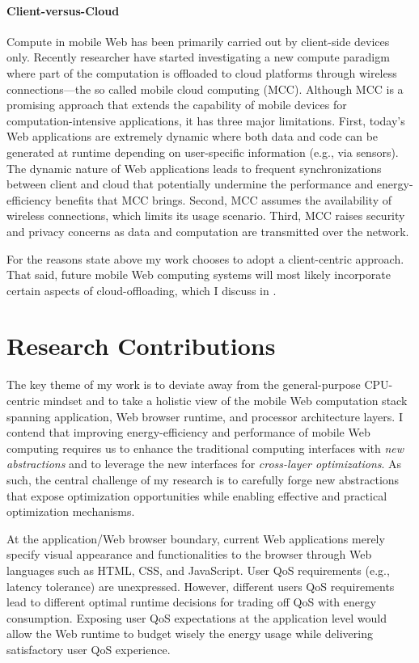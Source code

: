 \paragraph{Client-versus-Cloud} Compute in mobile Web has been primarily carried out by client-side devices only. Recently researcher have started investigating a new compute paradigm where part of the computation is offloaded to cloud platforms through wireless connections---the so called mobile cloud computing (MCC). Although MCC is a promising approach that extends the capability of mobile devices for computation-intensive applications, it has three major limitations. First, today's Web applications are extremely dynamic where both data and code can be generated at runtime depending on user-specific information (e.g., via sensors). The dynamic nature of Web applications leads to frequent synchronizations between client and cloud that potentially undermine the performance and energy-efficiency benefits that MCC brings. Second, MCC assumes the availability of wireless connections, which limits its usage scenario. Third, MCC raises security and privacy concerns as data and computation are transmitted over the network.

For the reasons state above my work chooses to adopt a client-centric approach. That said, future mobile Web computing systems will most likely incorporate certain aspects of cloud-offloading, which I discuss in .

\section{Research Contributions}
\label{sec:intro:work}

The key theme of my work is to deviate away from the general-purpose CPU-centric mindset and to take a holistic view of the mobile Web computation stack spanning application, Web browser runtime, and processor architecture layers. I contend that improving energy-efficiency and performance of mobile Web computing requires us to enhance the traditional computing interfaces with \textit{new abstractions} and to leverage the new interfaces for \textit{cross-layer optimizations}. As such, the central challenge of my research is to carefully forge new abstractions that expose optimization opportunities while enabling effective and practical optimization mechanisms.

At the application/Web browser boundary, current Web applications merely specify visual appearance and functionalities to the browser through Web languages such as HTML, CSS, and JavaScript. User QoS requirements (e.g., latency tolerance) are unexpressed. However, different users QoS requirements lead to different optimal runtime decisions for trading off QoS with energy consumption. Exposing user QoS expectations at the application level would allow the Web runtime to budget wisely the energy usage while delivering satisfactory user QoS experience.

